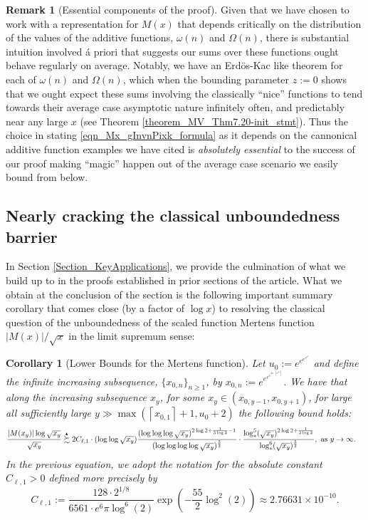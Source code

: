 \documentclass[11pt,reqno,a4letter]{article}
\numberwithin{figure}{section}
\numberwithin{table}{section}
\newcommand{\ceiling}[1]{\left\lceil #1 \right\rceil}
\theoremstyle{plain}
\newtheorem{cor}[theorem]{Corollary}
\numberwithin{theorem}{section}
\theoremstyle{definition}
\newtheorem{remark}[theorem]{Remark}
\newcommand{\SuccSim}[0]{\overset{_{\scriptsize{\blacktriangle}}}{\succsim}}
\begin{document}
\begin{remark}[Essential components of the proof]
Given that we have chosen to work with a representation for $M(x)$ that depends critically on 
the distribution of the values of the additive functions, $\omega(n)$ and $\Omega(n)$, there is 
substantial intuition involved \'{a} priori that suggests our sums over these functions ought 
behave regularly on average. Notably, we have an Erd\"os-Kac like theorem for each of 
$\omega(n)$ and $\Omega(n)$, which when the bounding parameter $z := 0$ shows that we 
ought expect these sums involving the classically ``nice'' functions to tend towards their 
average case asymptotic nature infinitely often, and predictably near any large $x$ 
\cite[\S 1.7]{IWANIEC-KOWALSKI} (see Theorem \ref{theorem_MV_Thm7.20-init_stmt}). 
Thus the choice in stating \eqref{eqn_Mx_gInvnPixk_formula} as it depends on the 
cannonical additive function examples we have cited is 
\emph{absolutely essential} to the success of 
our proof making ``magic'' happen out of the average case 
scenario we easily bound from below. 
\end{remark} 

\subsection{Nearly cracking the classical unboundedness barrier} 

In Section \ref{Section_KeyApplications}, 
we provide the culmination of what we build up to in the proofs established in 
prior sections of the article. 
What we obtain at the conclusion of the section 
is the following important summary corollary that comes close 
(by a factor of $\log x$) to resolving the classical question of the 
unboundedness of the scaled function Mertens function 
$|M(x)| / \sqrt{x}$ in the limit supremum sense: 

\begin{cor}[Lower Bounds for the Mertens function] 
\label{cor_ThePipeDreamResult_v1} 
Let $u_0 := e^{e^{e^{e^{e^{e}}}}}$ and define the infinite increasing subsequence, 
$\{x_{0,n}\}_{n \geq 1}$, by $x_{0,n} := e^{e^{e^{e^{4n \cdot \ceiling{e^{e^{4n}}}}}}}$. 
We have that along the increasing subsequence $x_y$, for some 
$x_y \in \left(x_{0,y-1}, x_{0,y+1}\right)$, for large all sufficiently large 
$y \gg \max\left(\ceiling{x_{0,1}}+1, u_0+2\right)$ the following bound holds: 
\begin{align*} 
\frac{|M(x_y)| \log \sqrt{x_y}}{\sqrt{x_y}} & \SuccSim 
     2C_{\ell,1} \cdot (\log\log \sqrt{x_y}) 
     \frac{(\log\log\log \sqrt{x_y})^{2\log 2+\frac{1}{3\log 2} - 1}}{ 
     (\log\log\log\log \sqrt{x_y})^{\frac{5}{2}}} \cdot 
     \frac{\log_{\ast}^5(\sqrt{x_y})^{2\log 2 + \frac{1}{3\log 2}}}{ 
     \log_{\ast}^{6}(\sqrt{x_y})^{\frac{5}{2}}}, \mathrm{\ as\ } y \rightarrow \infty. 
\end{align*} 
In the previous equation, we adopt the notation for the 
absolute constant $C_{\ell,1} > 0$ defined more precisely by 
\[
C_{\ell,1} := \frac{128 \cdot 2^{1/8}}{6561 \cdot e^6 \pi \log^6(2)} 
     \exp\left(-\frac{55}{2} \log^2(2)\right) 
     \approx 2.76631 \times 10^{-10}. 
\]
\end{cor} 
\end{document}
